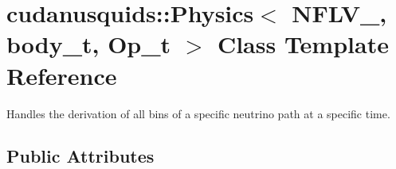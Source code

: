 \hypertarget{structcudanusquids_1_1Physics}{}\section{cudanusquids\+:\+:Physics$<$ N\+F\+L\+V\+\_\+, body\+\_\+t, Op\+\_\+t $>$ Class Template Reference}
\label{structcudanusquids_1_1Physics}


Handles the derivation of all bins of a specific neutrino path at a specific time.  


\subsection*{Public Attributes}
